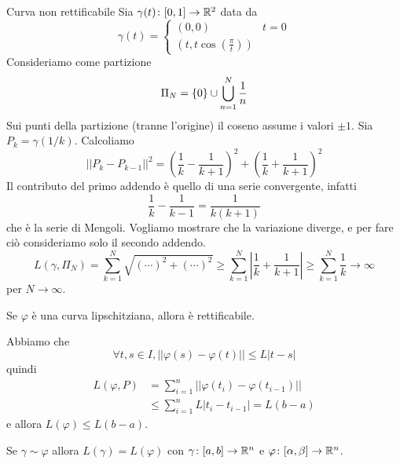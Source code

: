 \documentclass[a4paper]{article}
\begin{document}
\begin{snippetexample}{Curva non rettificabile}
    Sia \(\gamma(t) \colon [0,1] \to \mathbb{R}^2\) data da
    \[
        \gamma(t) = \begin{cases}
            (0,0 ) & t = 0 \\
            (t, t \cos \left(\frac\pi{t}\right))
        \end{cases}
    \]
    Consideriamo come partizione
    \[
        \Pi_N = \{0\} \cup \bigcup_{n=1}^N \frac1n
    \]
    Sui punti della partizione (tranne l'origine)
    il coseno assume i valori \(\pm 1\).
    Sia \(P_k = \gamma(1/k)\). Calcoliamo
    \[
        ||P_k - P_{k-1}||^2 = \left(
            \frac1k - \frac{1}{k+1}
        \right)^2 + \left(
            \frac1k + \frac{1}{k+1}
        \right)^2
    \]
    Il contributo del primo addendo è quello di una serie convergente, infatti
    \[
        \frac{1}{k} - \frac{1}{k-1} = \frac{1}{k(k+1)}
    \]
    che è la serie di Mengoli. Vogliamo mostrare che la variazione diverge,
    e per fare ciò consideriamo solo il secondo addendo.
    \[
        L(\gamma, \Pi_N) = \sum_{k=1}^N \sqrt{
            (\cdots)^2 + (\cdots)^2
        } \geq \sum_{k=1}^N \left|
            \frac{1}{k} + \frac{1}{k+1}
        \right| \geq \sum_{k=1}^N \frac{1}{k} \to \infty
    \]
    per \(N \to \infty\).
\end{snippetexample}

\begin{radioactive}
\begin{snippetproposition}{}
    Se \(\varphi\) è una curva lipschitziana, allora è rettificabile.
\end{snippetproposition}

\begin{snippetproof}{}
    Abbiamo che
    \[
        \forall t,s \in I, ||\varphi(s)-\varphi(t)|| \leq L|t-s|
    \]
    quindi
    \begin{align*}
        L(\varphi, P) &= \sum_{i=1}^n ||\varphi(t_i) - \varphi(t_{i-1})|| \\
        &\leq \sum_{i=1}^n L|t_i-t_{i-1}| = L(b-a)
    \end{align*}
    e allora \(L(\varphi) \leq L(b-a)\).
\end{snippetproof}
\end{radioactive}

\begin{snippettheorem}{}
    Se \(\gamma \sim \varphi\) allora \(L(\gamma) = L(\varphi)\)
    con \(\gamma \colon [a,b] \to \mathbb{R}^n\)
    e \(\varphi \colon [\alpha, \beta] \to \mathbb{R}^n\).
\end{snippettheorem}
\end{document}
